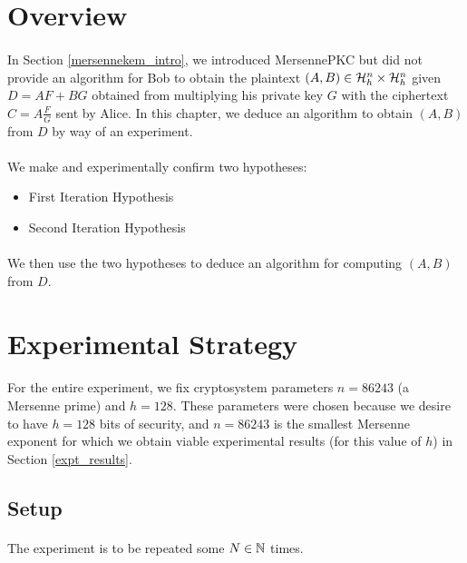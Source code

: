 \section{Overview}
\paragraph{}
In Section \ref{mersennekem_intro}, we introduced MersennePKC but did not provide an algorithm for Bob to obtain the plaintext $(A, B) \in \mathcal{H}_h^n \times \mathcal{H}_h^n$ given $D = AF + BG$ obtained from multiplying his private key $G$ with the ciphertext $C = A \frac{F}{G}$ sent by Alice. In this chapter, we deduce an algorithm to obtain $(A, B)$ from $D$ by way of an experiment.

\paragraph{}
We make and experimentally confirm two hypotheses:
\begin{itemize}
    \item First Iteration Hypothesis
    \item Second Iteration Hypothesis
\end{itemize}
\paragraph{}
We then use the two hypotheses to deduce an algorithm for computing $(A, B)$ from $D$.

\section{Experimental Strategy}
\paragraph{}
For the entire experiment, we fix cryptosystem parameters $n = 86243$ (a Mersenne prime) and $h = 128$. These parameters were chosen because we desire to have $h = 128$ bits of security, and $n = 86243$ is the smallest Mersenne exponent for which we obtain viable experimental results (for this value of $h$) in Section \ref{expt_results}.

\subsection{Setup} \label{correctness_strategy_setup}
\paragraph{}
The experiment is to be repeated some $N \in \mathbb{N}$ times.
